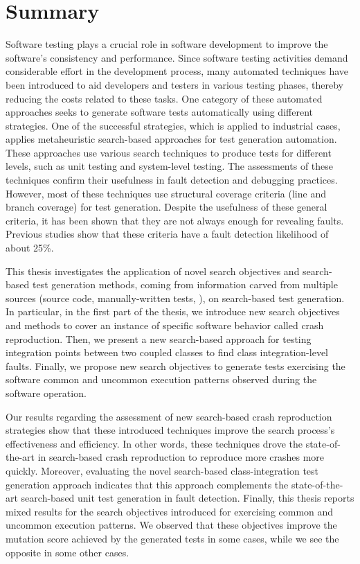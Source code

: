 \chapter*{Summary}

Software testing plays a crucial role in software development to improve the software's consistency and performance.
Since software testing activities demand considerable effort in the development process, many automated techniques have been introduced to aid developers and testers in various testing phases, thereby reducing the costs related to these tasks. One category of these automated approaches seeks to generate software tests automatically using different strategies. One of the successful strategies, which is applied to industrial cases, applies metaheuristic search-based approaches for test generation automation. These approaches use various search techniques to produce tests for different levels, such as unit testing and system-level testing. The assessments of these techniques confirm their usefulness in fault detection and debugging practices. However, most of these techniques use structural coverage criteria (\eg line and branch coverage) for test generation. Despite the usefulness of these general criteria, it has been shown that they are not always enough for revealing faults. Previous studies show that these criteria have a fault detection likelihood of about 25\%.

This thesis investigates the application of novel search objectives and search-based test generation methods, coming from information carved from multiple sources (\eg source code, manually-written tests, \etc), on search-based test generation. In particular, in the first part of the thesis, we introduce new search objectives and methods to cover an instance of specific software behavior called crash reproduction. Then, we present a new search-based approach for testing integration points between two coupled classes to find class integration-level faults. Finally, we propose new search objectives to generate tests exercising the software common and uncommon execution patterns observed during the software operation.

Our results regarding the assessment of new search-based crash reproduction strategies show that these introduced techniques improve the search process's effectiveness and efficiency. In other words, these techniques drove the state-of-the-art in search-based crash reproduction to reproduce more crashes more quickly. 
Moreover, evaluating the novel search-based class-integration test generation approach indicates that this approach complements the state-of-the-art search-based unit test generation in fault detection. 
Finally, this thesis reports mixed results for the search objectives introduced for exercising common and uncommon execution patterns. We observed that these objectives improve the mutation score achieved by the generated tests in some cases, while we see the opposite in some other cases.


